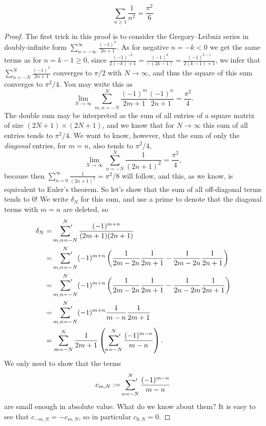 \begin{theorem}
  \label{euler_series_4}
  \leanok
  \[
  \sum_{n\ge 1}\frac{1}{n^2} = \frac{\pi^2}{6}
  \]
\end{theorem}
\begin{proof}
  The first trick in this proof is to consider the Gregory–Leibniz series in doubly-infinite form $\sum_{n=-\infty}^\infty \frac{(-1)^n}{2n+1}$.
  As for negative $n = -k < 0$ we get the same terms as for $n = k-1 \ge 0$, since $\frac{(-1)^{-k}}{2(-k)+1} = \frac{(-1)^k}{-(2k-1)} = \frac{(-1)^{k-1}}{2(k-1)+1}$, we infer that $\sum_{n=-N}^N \frac{(-1)^n}{2n+1}$ converges to $\pi/2$ with $N \to \infty$, and thus the square of this sum converges to $\pi^2/4$.
  You may write this as
  \[
  \lim_{N \to \infty} \sum_{m,n=-N}^N \frac{(-1)^m}{2m+1} \frac{(-1)^n}{2n+1} = \frac{\pi^2}{4}.
  \]
  The double sum may be interpreted as the sum of all entries of a square matrix of size $(2N+1) \times (2N+1)$, and we know that for $N \to \infty$ this sum of all entries tends to $\pi^2/4$.
  We want to know, however, that the sum of only the \emph{diagonal} entries, for $m=n$, also tends to $\pi^2/4$,
  \[
  \lim_{N \to \infty} \sum_{n=-N}^N \frac{1}{(2n+1)^2} = \frac{\pi^2}{4},
  \]
  because then $\sum_{n=0}^\infty \frac{1}{(2n+1)^2} = \pi^2/8$ will follow, and this, as we know, is equivalent to Euler's theorem.
  So let's show that the sum of all off-diagonal terms tends to $0$!
  We write $\delta_N$ for this sum, and use a prime to denote that the diagonal terms with $m=n$ are deleted, so
  \begin{align*}
  \delta_N &= \sideset{}{'}\sum_{m,n=-N}^N \frac{(-1)^{m+n}}{(2m+1)(2n+1)} \\
  &= \sideset{}{'}\sum_{m,n=-N}^N (-1)^{m+n} \left(\frac{1}{2m-2n}\frac{1}{2m+1} - \frac{1}{2m-2n}\frac{1}{2n+1}\right) \\
  &= \sideset{}{'}\sum_{m,n=-N}^N (-1)^{m+n} \left(\frac{1}{2m-2n}\frac{1}{2m+1} - \frac{1}{2n-2m}\frac{1}{2m+1}\right) \\
  &= \sideset{}{'}\sum_{m,n=-N}^N (-1)^{m+n} \frac{1}{m-n} \frac{1}{2m+1} \\
  &= \sum_{m=-N}^N \frac{1}{2m+1} \left(\sideset{}{'}\sum_{n=-N}^N \frac{(-1)^{m-n}}{m-n}\right).
  \end{align*}
  We only need to show that the terms
  \[
  c_{m,N} := \sideset{}{'}\sum_{n=-N}^N \frac{(-1)^{m-n}}{m-n}
  \]
  are small enough in absolute value.
  What do we know about them?
  It is easy to see that $c_{-m,N} = -c_{m,N}$, so in particular $c_{0,N} = 0$.

\end{proof}
